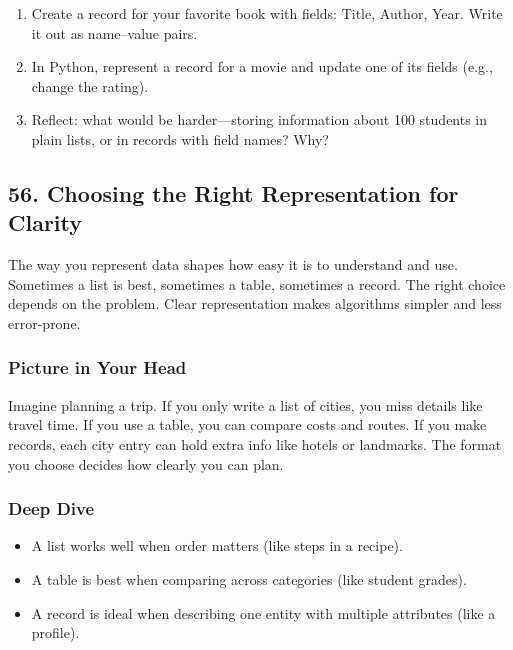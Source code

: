 \documentclass[
  letterpaper,
  DIV=11,
  numbers=noendperiod]{scrreprt}
\providecommand{\tightlist}{%
  \setlength{\itemsep}{0pt}\setlength{\parskip}{0pt}}
\begin{document}
\begin{enumerate}
\def\labelenumi{\arabic{enumi}.}
\tightlist
\item
  Create a record for your favorite book with fields: Title, Author,
  Year. Write it out as name--value pairs.
\item
  In Python, represent a record for a movie and update one of its fields
  (e.g., change the rating).
\item
  Reflect: what would be harder---storing information about 100 students
  in plain lists, or in records with field names? Why?
\end{enumerate}

\subsection{56. Choosing the Right Representation for
Clarity}\label{choosing-the-right-representation-for-clarity}

The way you represent data shapes how easy it is to understand and use.
Sometimes a list is best, sometimes a table, sometimes a record. The
right choice depends on the problem. Clear representation makes
algorithms simpler and less error-prone.

\subsubsection{Picture in Your Head}\label{picture-in-your-head-55}

Imagine planning a trip. If you only write a list of cities, you miss
details like travel time. If you use a table, you can compare costs and
routes. If you make records, each city entry can hold extra info like
hotels or landmarks. The format you choose decides how clearly you can
plan.

\subsubsection{Deep Dive}\label{deep-dive-25}

\begin{itemize}
\tightlist
\item
  A list works well when order matters (like steps in a recipe).
\item
  A table is best when comparing across categories (like student
  grades).
\item
  A record is ideal when describing one entity with multiple attributes
  (like a profile).
\end{itemize}
\end{document}
